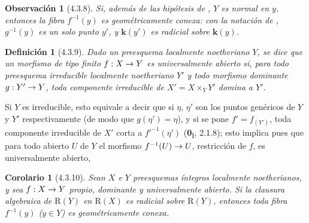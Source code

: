 \documentclass[10pt,oneside,openany]{book}
\theoremstyle{egaenv}\newtheorem*{env}{---}
\theoremstyle{egastatement}
\newtheorem*{corollary}{Corolario}
\theoremstyle{egadescription}
\newtheorem*{definition}{Definición}
\newtheorem*{remark}{Observación}
\renewcommand{\to}{\mathchoice{\longrightarrow}{\rightarrow}{\rightarrow}{\rightarrow}}
\begin{document}
\begin{remark}[4.3.8]
\label{III.4.3.8}
\label{III.4.3.8-fr}
Si, además de las hipótesis de , $Y$ es \emph{normal} en
$y$, entonces la fibra $f^{-1}(y)$ es geométricamente conexa: con la
notación de , $g^{-1}(y)$ es un solo punto $y'$, y
$\boldsymbol{k}(y')$ es radicial sobre $\boldsymbol{k}(y)$.
\end{remark}

\begin{definition}[4.3.9]
\label{III.4.3.9-fr}
Dado un preesquema localmente noetheriano $Y$, se dice que un morfismo \textup{de
tipo finito} $f:X\to Y$ es universalmente abierto si, para todo
preesquema irreducible localmente noetheriano $Y'$ y todo morfismo dominante
$g:Y'\to Y$, toda componente irreducible de $X'=X\times_YY'$ domina a $Y'$.
\end{definition}

Si $Y$ es irreducible, esto equivale a decir que si $\eta$, $\eta'$ son los
puntos genéricos de $Y$ y $Y'$ respectivamente (de modo que
$g(\eta')=\eta$), y si se pone $f'=f_{(Y')}$, toda componente irreducible
de $X'$ corta a $f'^{-1}(\eta')$ (\textbf{0}\textsubscript{I}, 2.1.8); esto
implica pues que para todo abierto $U$ de $Y$ el morfismo
$f^{-1}(U)\to U$, restricción de $f$, es universalmente abierto,

\begin{corollary}[4.3.10]
\label{III.4.3.10}
\label{III.4.3.10-fr}
Sean $X$ e $Y$ preesquemas íntegros localmente noetherianos, y sea
$f:X\to Y$ propio, dominante y universalmente abierto. Si la clausura
algebraica de $\mathrm R(Y)$ en $\mathrm R(X)$ es radicial sobre
$\mathrm R(Y)$, entonces toda fibra $f^{-1}(y)$ ($y\in Y$) es geométricamente conexa.
\end{corollary}
\end{document}
